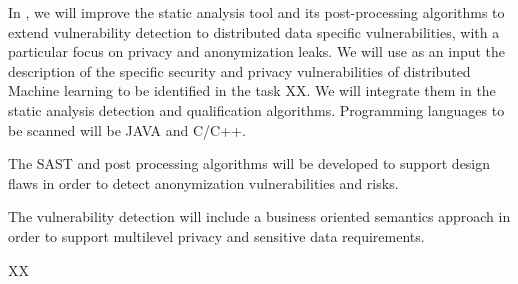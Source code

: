 \begin{Workpackage}{\thewpno}
 
\begin{Task}

\TaskResults{%
}
\TaskHeader{}
In \theTask, we will improve the static analysis tool and its post-processing algorithms to extend vulnerability detection to distributed data specific vulnerabilities, with a particular focus on privacy and anonymization leaks. We will use as an input the description of the specific security and privacy vulnerabilities of distributed Machine learning to be identified in the task XX. We will integrate them in the static analysis detection and qualification algorithms. Programming languages to be scanned will be JAVA and C/C++.

The SAST and post processing algorithms will be developed to support design flaws in order to detect anonymization vulnerabilities and risks.

The vulnerability detection will include a business oriented semantics approach in order to support multilevel privacy and sensitive data requirements.

 \end{Task}


\begin{WPDeliverables}
  \begin{compactitem}
    \item XX
\end{compactitem}
\end{WPDeliverables}
\end{Workpackage}
